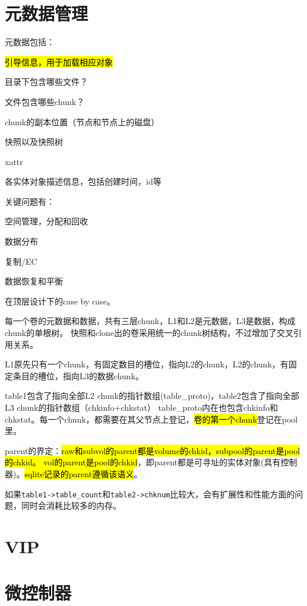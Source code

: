 \section{元数据管理}

元数据包括：
\begin{enumbox}
\item \hl{引导信息，用于加载相应对象}
\item 目录下包含哪些文件？
\item 文件包含哪些chunk？
\item chunk的副本位置（节点和节点上的磁盘）
\item 快照以及快照树
\item xattr
\item 各实体对象描述信息，包括创建时间，id等
\end{enumbox}

关键问题有：
\begin{enumbox}
\item 空间管理，分配和回收
\item 数据分布
\item 复制/EC
\item 数据恢复和平衡
\end{enumbox}

在顶层设计下的case by case。

每一个卷的元数据和数据，共有三层chunk，L1和L2是元数据，L3是数据，构成chunk的单根树。
快照和clone出的卷采用统一的chunk树结构，不过增加了交叉引用关系。

L1原先只有一个chunk，有固定数目的槽位，指向L2的chunk，L2的chunk，有固定条目的槽位，指向L3的数据chunk。

table1包含了指向全部L2 chunk的指针数组(table\_proto)，table2包含了指向全部L3 chunk的指针数组（chkinfo+chkstat）
table\_proto内在也包含chkinfo和chkstat。每一个chunk，都需要在其父节点上登记，\hl{卷的第一个chunk}登记在pool里。

parent的界定：\hl{raw和subvol的parent都是volume的chkid，subpool的parent是pool的chkid。
vol的parent是pool的chkid}，即parent都是可寻址的实体对象(具有控制器)。\hl{sqlite记录的parent遵循该语义}。

如果\verb|table1->table_count|和\verb|table2->chknum|比较大，会有扩展性和性能方面的问题，同时会消耗比较多的内存。

\section{VIP}

\section{微控制器}

